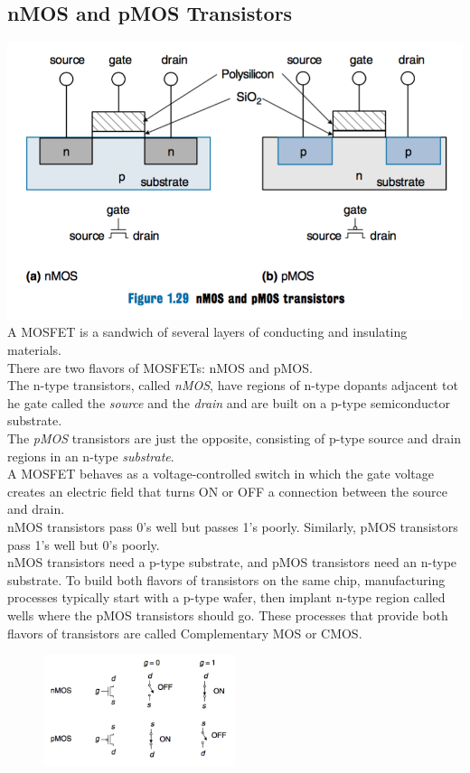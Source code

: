 \documentclass[12pt]{article}
\theoremstyle{definition}
\begin{document}
  \subsection{nMOS and pMOS Transistors}
  \includegraphics{pictures/nMOSpMOS.png} \\
  A MOSFET is a sandwich of several layers of conducting and insulating materials. \\
  There are two flavors of MOSFETs: nMOS and pMOS. \\
  The n-type transistors, called \emph{nMOS}, have regions of n-type dopants adjacent tot he gate called the \emph{source} and the \emph{drain} and are built on a p-type semiconductor substrate. \\
  The \emph{pMOS} transistors are just the opposite, consisting of p-type source and drain regions in an n-type \emph{substrate}. \\
  A MOSFET behaves as a voltage-controlled switch in which the gate voltage creates an electric field that turns ON or OFF a connection between the source and drain. \\
  nMOS transistors pass 0's well but passes 1's poorly.
  Similarly, pMOS transistors pass 1's well but 0's poorly. \\
  nMOS transistors need a p-type substrate, and pMOS transistors need an n-type substrate.
  To build both flavors of transistors on the same chip, manufacturing processes typically start with a p-type wafer, then implant n-type region called wells where the pMOS transistors should go.
  These processes that provide both flavors of transistors are called Complementary MOS or CMOS.
  \begin{figure}
    \centering
    \includegraphics[width=0.5\textwidth]{pictures/nMOSpMOSGate.png}
  \end{figure}
\end{document}
